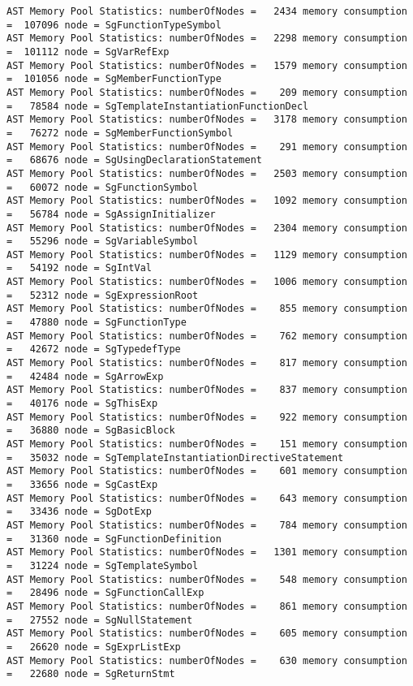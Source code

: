 {{\begin{verbatim}
AST Memory Pool Statistics: numberOfNodes =   2434 memory consumption =  107096 node = SgFunctionTypeSymbol
AST Memory Pool Statistics: numberOfNodes =   2298 memory consumption =  101112 node = SgVarRefExp
AST Memory Pool Statistics: numberOfNodes =   1579 memory consumption =  101056 node = SgMemberFunctionType
AST Memory Pool Statistics: numberOfNodes =    209 memory consumption =   78584 node = SgTemplateInstantiationFunctionDecl
AST Memory Pool Statistics: numberOfNodes =   3178 memory consumption =   76272 node = SgMemberFunctionSymbol
AST Memory Pool Statistics: numberOfNodes =    291 memory consumption =   68676 node = SgUsingDeclarationStatement
AST Memory Pool Statistics: numberOfNodes =   2503 memory consumption =   60072 node = SgFunctionSymbol
AST Memory Pool Statistics: numberOfNodes =   1092 memory consumption =   56784 node = SgAssignInitializer
AST Memory Pool Statistics: numberOfNodes =   2304 memory consumption =   55296 node = SgVariableSymbol
AST Memory Pool Statistics: numberOfNodes =   1129 memory consumption =   54192 node = SgIntVal
AST Memory Pool Statistics: numberOfNodes =   1006 memory consumption =   52312 node = SgExpressionRoot
AST Memory Pool Statistics: numberOfNodes =    855 memory consumption =   47880 node = SgFunctionType
AST Memory Pool Statistics: numberOfNodes =    762 memory consumption =   42672 node = SgTypedefType
AST Memory Pool Statistics: numberOfNodes =    817 memory consumption =   42484 node = SgArrowExp
AST Memory Pool Statistics: numberOfNodes =    837 memory consumption =   40176 node = SgThisExp
AST Memory Pool Statistics: numberOfNodes =    922 memory consumption =   36880 node = SgBasicBlock
AST Memory Pool Statistics: numberOfNodes =    151 memory consumption =   35032 node = SgTemplateInstantiationDirectiveStatement
AST Memory Pool Statistics: numberOfNodes =    601 memory consumption =   33656 node = SgCastExp
AST Memory Pool Statistics: numberOfNodes =    643 memory consumption =   33436 node = SgDotExp
AST Memory Pool Statistics: numberOfNodes =    784 memory consumption =   31360 node = SgFunctionDefinition
AST Memory Pool Statistics: numberOfNodes =   1301 memory consumption =   31224 node = SgTemplateSymbol
AST Memory Pool Statistics: numberOfNodes =    548 memory consumption =   28496 node = SgFunctionCallExp
AST Memory Pool Statistics: numberOfNodes =    861 memory consumption =   27552 node = SgNullStatement
AST Memory Pool Statistics: numberOfNodes =    605 memory consumption =   26620 node = SgExprListExp
AST Memory Pool Statistics: numberOfNodes =    630 memory consumption =   22680 node = SgReturnStmt

\end{verbatim}}}
